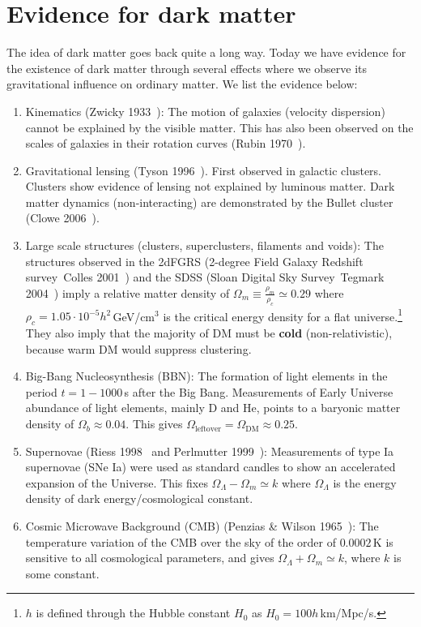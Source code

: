 \documentclass[notes.tex]{subfiles}
\begin{document}
\section{Evidence for dark matter}
The idea of dark matter goes back quite a long way. Today we have evidence for the existence of dark matter through several effects where we observe its gravitational influence on ordinary matter. We list the evidence below:
\begin{enumerate}[1)]
\item Kinematics  (Zwicky 1933~\cite{Zwicky:1933gu}): The motion of galaxies (velocity dispersion) cannot be explained by the visible matter. This has also been observed on the scales of galaxies in their rotation curves (Rubin 1970~\cite{Rubin:1970zz}).
\item Gravitational lensing (Tyson 1996~\cite{Fischer:1996eb}). First observed in galactic clusters. Clusters show evidence of lensing not explained by luminous matter.  Dark matter dynamics (non-interacting) are demonstrated by the Bullet cluster (Clowe 2006~\cite{Clowe:2006eq}). 
\item Large scale structures (clusters, superclusters, filaments and voids): The structures observed in the 2dFGRS (2-degree Field Galaxy Redshift survey~Colles 2001~\cite{Hawkins:2002sg}) and the SDSS (Sloan Digital Sky Survey~Tegmark 2004~\cite{Abazajian:2004it}) imply a relative matter density of $\Omega_m \equiv \frac{\rho_m}{\rho_c} \simeq  0.29$ where $\rho_c = 1.05\cdot 10^{-5}h^2$\,GeV/cm$^3$ is the critical energy density for a flat universe.\footnote{$h$ is defined through the Hubble constant $H_0$ as $H_0=100 h$\,km/Mpc/s.} They also imply that the majority of DM must be {\bf cold} (non-relativistic), because warm DM would suppress clustering.
\item Big-Bang Nucleosynthesis (BBN): The formation of light elements in the period $t = 1-1000$\,s after the Big Bang. Measurements of Early Universe abundance of light elements, mainly D and He, points to a baryonic matter density of $\Omega_b \approx 0.04$. This gives $\Omega_{\text{leftover}}=\Omega_{\text{DM}} \approx 0.25$.
\item Supernovae (Riess 1998~\cite{Riess:1998cb} and Perlmutter 1999~\cite{Perlmutter:1999jt}): Measurements of type Ia supernovae (SNe Ia) were used as standard candles to show an accelerated expansion of the Universe. This fixes $\Omega_\Lambda-\Omega_m \simeq k$ where $\Omega_\Lambda$ is the energy density of dark energy/cosmological constant.
\item Cosmic Microwave Background (CMB) (Penzias \& Wilson 1965~\cite{Penzias:1965wn}): The temperature variation of the CMB over the sky of the order of $0.0002$\,K is sensitive to all cosmological parameters, and gives $\Omega_\Lambda +\Omega_m \simeq k$, where $k$ is some constant.
\end{enumerate}
\end{document}
